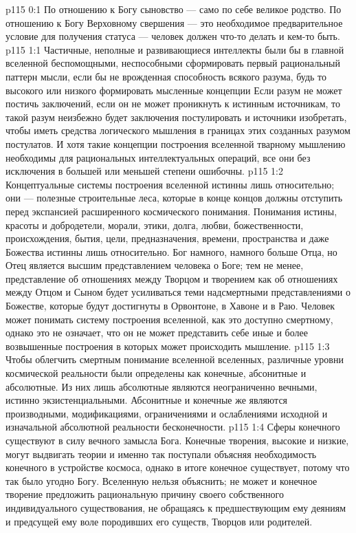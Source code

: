 \author{Могучий Вестник}
\vs p115 0:1 По отношению к Богу сыновство --- само по себе великое родство. По отношению к Богу Верховному свершения --- это необходимое предварительное условие для получения статуса --- человек должен что\hyp{}то делать и кем\hyp{}то быть.
\vs p115 1:1 Частичные, неполные и развивающиеся интеллекты были бы в главной вселенной беспомощными, неспособными сформировать первый рациональный паттерн мысли, если бы не врожденная способность всякого разума, будь то высокого или низкого формировать мысленные концепции  Если разум не может постичь заключений, если он не может проникнуть к истинным источникам, то такой разум неизбежно будет заключения постулировать и источники изобретать, чтобы иметь средства логического мышления в границах этих созданных разумом постулатов. И хотя такие концепции построения вселенной тварному мышлению необходимы для рациональных интеллектуальных операций, все они без исключения в большей или меньшей степени ошибочны.
\vs p115 1:2 Концептуальные системы построения вселенной истинны лишь относительно; они --- полезные строительные леса, которые в конце концов должны отступить перед экспансией расширенного космического понимания. Понимания истины, красоты и добродетели, морали, этики, долга, любви, божественности, происхождения, бытия, цели, предназначения, времени, пространства и даже Божества истинны лишь относительно. Бог намного, намного больше Отца, но Отец является высшим представлением человека о Боге; тем не менее, представление об отношениях между Творцом и творением как об отношениях между Отцом и Сыном будет усиливаться теми надсмертными представлениями о Божестве, которые будут достигнуты в Орвонтоне, в Хавоне и в Раю. Человек может понимать систему построения вселенной, как это доступно смертному, однако это не означает, что он не может представить себе иные и более возвышенные построения в которых может происходить мышление.
\vs p115 1:3 Чтобы облегчить смертным понимание вселенной вселенных, различные уровни космической реальности были определены как конечные, абсонитные и абсолютные. Из них лишь абсолютные являются неограниченно вечными, истинно экзистенциальными. Абсонитные и конечные же являются производными, модификациями, ограничениями и ослаблениями исходной и изначальной абсолютной реальности бесконечности.
\vs p115 1:4 Сферы конечного существуют в силу вечного замысла Бога. Конечные творения, высокие и низкие, могут выдвигать теории и именно так поступали объясняя необходимость конечного в устройстве космоса, однако в итоге конечное существует, потому что так было угодно Богу. Вселенную нельзя объяснить; не может и конечное творение предложить рациональную причину своего собственного индивидуального существования, не обращаясь к предшествующим ему деяниям и предсущей ему воле породивших его существ, Творцов или родителей.
